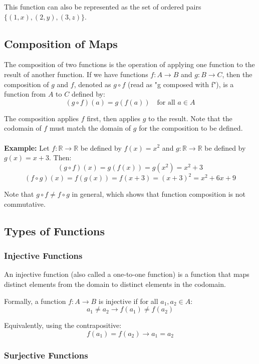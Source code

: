 This function can also be represented as the set of ordered pairs \(\{(1,x), (2,y), (3,z)\}\).

\subsection{Composition of Maps}
The composition of two functions is the operation of applying one function to the result of another function. If we have functions \(f: A \to B\) and \(g: B \rightarrow C\), then the composition of \(g\) and \(f\), denoted as \(g \circ f\) (read as "g composed with f"), is a function from \(A\) to \(C\) defined by:
\[
	(g \circ f)(a) = g(f(a)) \quad \text{for all } a \in A
\]

The composition applies \(f\) first, then applies \(g\) to the result. Note that the codomain of \(f\) must match the domain of \(g\) for the composition to be defined.
\\\\
\textbf{Example:} Let \(f: \mathbb{R} \to \mathbb{R}\) be defined by \(f(x) = x^2\) and \(g: \mathbb{R} \rightarrow \mathbb{R}\) be defined by \(g(x) = x+3\). Then:
\[
	(g \circ f)(x) = g(f(x)) = g(x^2) = x^2 + 3
\]
\[
	(f \circ g)(x) = f(g(x)) = f(x+3) = (x+3)^2 = x^2 + 6x + 9
\]

Note that \(g \circ f \neq f \circ g\) in general, which shows that function composition is not commutative.

\subsection{Types of Functions}

\subsubsection*{Injective Functions}

An injective function (also called a one-to-one function) is a function that maps distinct elements from the domain to distinct elements in the codomain.

Formally, a function \(f: A \to B\) is injective if for all \(a_1, a_2 \in A\):
\[
	a_1 \neq a_2 \to f(a_1) \neq f(a_2)
\]

Equivalently, using the contrapositive:
\[
	f(a_1) = f(a_2) \to a_1 = a_2
\]

\subsubsection*{Surjective Functions}

